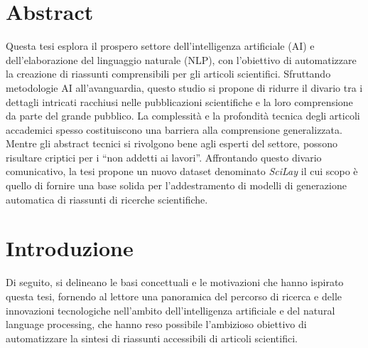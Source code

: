 \documentclass[12pt,a4paper,twoside,openright]{book}
\begin{document}
\frontmatter 

\maketitle

\chapter*{Abstract}

Questa tesi esplora il prospero settore dell'intelligenza artificiale (AI) e dell'elaborazione del linguaggio naturale (NLP), con l'obiettivo di automatizzare la creazione di riassunti comprensibili per gli articoli scientifici. Sfruttando metodologie AI all'avanguardia, questo studio si propone di ridurre il divario tra i dettagli intricati racchiusi nelle pubblicazioni scientifiche e la loro comprensione da parte del grande pubblico.
La complessità e la profondità tecnica degli articoli accademici spesso costituiscono una barriera alla comprensione generalizzata. Mentre gli abstract tecnici si rivolgono bene agli esperti del settore, possono risultare criptici per i ``non addetti ai lavori''. Affrontando questo divario comunicativo, la tesi propone un nuovo dataset denominato \emph{SciLay} il cui scopo è quello di fornire una base solida per l'addestramento di modelli di generazione automatica di riassunti di ricerche scientifiche.

\newpage

\tableofcontents

\newpage

\listoffigures

\mainmatter

\pagestyle{fancy} 
\fancyhead[LO]{\nouppercase{\rightmark}}
\fancyhead[RE]{\nouppercase{\leftmark}}
\fancyhead[LE,RO]{\thepage}
\fancyfoot{}


\chapter{Introduzione}\label{cap:intro}

Di seguito, si delineano le basi concettuali e le motivazioni che hanno ispirato questa tesi, fornendo al lettore una panoramica del percorso di ricerca e delle innovazioni tecnologiche nell'ambito dell'intelligenza artificiale e del natural language processing, che hanno reso possibile l'ambizioso obiettivo di automatizzare la sintesi di riassunti accessibili di articoli scientifici.
\end{document}
